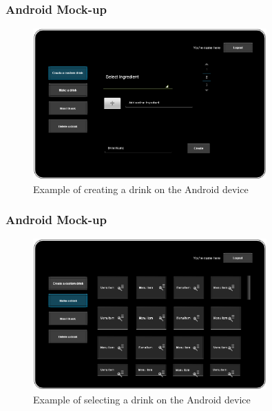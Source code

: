 \begin{frame}
    \frametitle{Android Mock-up}
    \begin{figure}[htb]
        \centering
        \includegraphics[width=0.8\textwidth]{../Mock-ups/Android_CreateDrink.png}
        \caption{Example of creating a drink on the Android device}
        \label{fig:CreateDrinkAndroid}
    \end{figure}
\end{frame}
\begin{frame}
    \frametitle{Android Mock-up}
    \begin{figure}[htb]
        \centering
        \includegraphics[width=0.8\textwidth]{../Mock-ups/Android_SelectDrink.png}
        \caption{Example of selecting a drink on the Android device}
        \label{fig:SelectingDrinkAndroid}
    \end{figure}
\end{frame}
